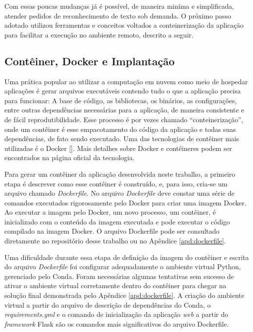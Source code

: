 Com essas poucas mudanças já é possível, de maneira miníma e simplificada, atender pedidos de reconhecimento de texto sob demanda. O próximo 
passo adotado utilizou ferramentas e conceitos voltados a conteinerização da aplicação para facilitar a execução no ambiente remoto, descrito a seguir.

\subsection{Contêiner, Docker e Implantação}
Uma prática popular ao utilizar a computação em nuvem como meio de hospedar aplicações é gerar arquivos executáveis contendo tudo o que a aplicação 
precisa para funcionar: A base de código, as bibliotecas, os binários, as configurações, entre outras dependências necessárias para a aplicação, de maneira consistente e de 
fácil reprodutibilidade. Esse processo é por vezes chamado “conteinerização”, onde um contêiner é esse empacotamento do código da aplicação e todas suas dependências, 
de fato sendo executado. Uma das tecnologias de contêiner mais utilizadas é o Docker []. Mais detalhes sobre Docker e contêineres podem 
ser encontrados na página oficial da tecnologia.

Para gerar um contêiner da aplicação desenvolvida neste trabalho, a primeiro etapa é descrever como esse contêiner é construído, e, para isso, 
cria-se um arquivo chamado \textit{Dockerfile}. No arquivo \textit{Dockerfile} deve constar uma série de comandos executados rigorosamente pelo Docker 
para criar uma imagem Docker. Ao executar a imagem pelo Docker, um novo processo, um contêiner, é inicializado com o conteúdo da imagem executada e 
pode executar o código compilado na imagem Docker. O arquivo Dockerfile pode ser consultado diretamente no repositório desse trabalho ou no 
Apêndice \ref{apd:dockerfile}.

Uma dificuldade durante essa etapa de definição da imagem do contêiner e escrita do arquivo \textit{Dockerfile} foi configurar adequadamente o ambiente virtual Python, gerenciado pelo Conda. Foram necessárias algumas tentativas sem sucesso de ativar o ambiente virtual corretamente dentro do contêiner para chegar na solução final demonstrada pelo Apêndice \ref{apd:dockerfile}. A criação do ambiente virtual a partir do arquivo de descrição de dependências do Conda, o \textit{requirements.yml} e o comando de inicialização da aplicação \textit{web} a partir do \textit{framework} Flask são os comandos mais significativos do arquivo Dockerfile.

